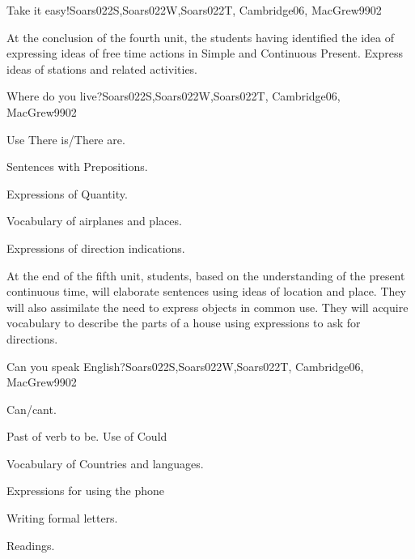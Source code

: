 \begin{syllabus}
\begin{unit}{Take it easy!}{}{Soars022S,Soars022W,Soars022T, Cambridge06, MacGrew99}{0}{2}
   \begin{learningoutcomes}
      \item At the conclusion of the fourth unit, the students having identified the idea of expressing ideas of free time actions in Simple and Continuous Present. Express ideas of stations and related activities.
   \end{learningoutcomes}

\end{unit}

\begin{unit}{Where do you live?}{}{Soars022S,Soars022W,Soars022T, Cambridge06, MacGrew99}{0}{2}
   \begin{topics}
      \item Use There is/There are.
      \item Sentences with Prepositions.
      \item Expressions of Quantity.
      \item Vocabulary of airplanes and places.
      \item Expressions of direction indications.
   \end{topics}

   \begin{learningoutcomes}
      \item At the end of the fifth unit, students, based on the understanding of the present continuous time, will elaborate sentences using ideas of location and place. They will also assimilate the need to express objects in common use. They will acquire vocabulary to describe the parts of a house using expressions to ask for directions.
   \end{learningoutcomes}

\end{unit}

\begin{unit}{Can you speak English?}{}{Soars022S,Soars022W,Soars022T, Cambridge06, MacGrew99}{0}{2}
   \begin{topics}
      \item Can/cant.
      \item Past of verb to be. Use of Could
      \item Vocabulary of Countries and languages.
      \item Expressions for using the phone
      \item Writing formal letters.
      \item Readings.
   \end{topics}


\end{unit}
\end{syllabus}
